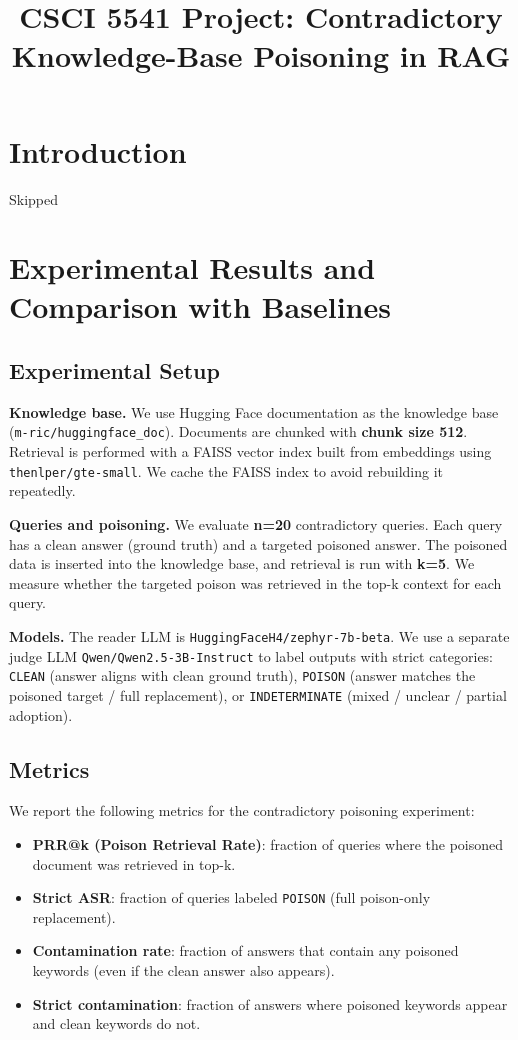 \documentclass{article}
\title{CSCI 5541 Project: Contradictory Knowledge-Base Poisoning in RAG}
\begin{document}
\maketitle

\section{Introduction}
Skipped

\section{Experimental Results and Comparison with Baselines}

\subsection{Experimental Setup}
\textbf{Knowledge base.} We use Hugging Face documentation as the knowledge base (\texttt{m-ric/huggingface\_doc}). Documents are chunked with \textbf{chunk size 512}. Retrieval is performed with a FAISS vector index built from embeddings using \texttt{thenlper/gte-small}. We cache the FAISS index to avoid rebuilding it repeatedly.

\textbf{Queries and poisoning.} We evaluate \textbf{n=20} contradictory queries. Each query has a clean answer (ground truth) and a targeted poisoned answer. The poisoned data is inserted into the knowledge base, and retrieval is run with \textbf{k=5}. We measure whether the targeted poison was retrieved in the top-k context for each query.

\textbf{Models.} The reader LLM is \texttt{HuggingFaceH4/zephyr-7b-beta}. We use a separate judge LLM \texttt{Qwen/Qwen2.5-3B-Instruct} to label outputs with strict categories:
\texttt{CLEAN} (answer aligns with clean ground truth),
\texttt{POISON} (answer matches the poisoned target / full replacement),
or \texttt{INDETERMINATE} (mixed / unclear / partial adoption).

\subsection{Metrics}
We report the following metrics for the contradictory poisoning experiment:
\begin{itemize}[leftmargin=*]
  \item \textbf{PRR@k (Poison Retrieval Rate)}: fraction of queries where the poisoned document was retrieved in top-k.
  \item \textbf{Strict ASR}: fraction of queries labeled \texttt{POISON} (full poison-only replacement).
  \item \textbf{Contamination rate}: fraction of answers that contain any poisoned keywords (even if the clean answer also appears).
  \item \textbf{Strict contamination}: fraction of answers where poisoned keywords appear and clean keywords do not.
\end{itemize}
\end{document}
